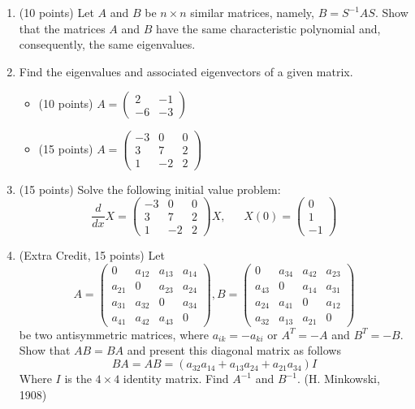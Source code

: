 \documentclass[fleqn]{article}
\begin{document}
  \begin{enumerate}
    \item (10 points) Let $A$ and $B$ be $n \times n$ similar matrices, namely, $B=S^{-1} AS$. Show that the matrices $A$ and $B$ have 
    the same characteristic polynomial and,  consequently, the same eigenvalues.

    \item Find the eigenvalues and associated eigenvectors of a given matrix.
    \begin{itemize}
      \item (10 points) $A=\begin{pmatrix}
        2 & -1 
        \\
        -6 & -3
      \end{pmatrix}$
      \item (15 points) $A=\begin{pmatrix}
        -3 & 0 & 0
        \\
        3 & 7 & 2
        \\
        1 & -2 & 2
      \end{pmatrix}$
    \end{itemize}

    \item (15 points) Solve the following initial value problem:
    $$
      \dfrac{d}{dx} X=\begin{pmatrix}
        -3 & 0 & 0
        \\
        3 & 7 & 2 
        \\
        1 & -2 & 2
      \end{pmatrix} X, ~~~~~~~ X(0)=\begin{pmatrix}
        0 
        \\
        1
        \\
        -1
      \end{pmatrix}
    $$

    \item  (Extra Credit, 15 points) Let
    $$
      A=\begin{pmatrix}
        0 & a_{12} & a_{13} & a_{14}
        \\
        a_{21} & 0 & a_{23} & a_{24}
        \\
        a_{31} & a_{32} & 0 & a_{34}
        \\
        a_{41} & a_{42} & a_{43} & 0
      \end{pmatrix}
      , B=\begin{pmatrix}
        0 & a_{34} & a_{42} & a_{23}
        \\
        a_{43} & 0 & a_{14} & a_{31}
        \\
        a_{24} & a_{41} & 0 & a_{12}
        \\
        a_{32} & a_{13} & a_{21} & 0
      \end{pmatrix}
    $$
    be two antisymmetric matrices, where $a_{ik}=-a_{ki}$ or $A^T=-A$ and $B^T=-B$. Show that 
    $AB=BA$ and present this diagonal matrix as follows
    $$
      BA=AB=\left(a_{32} a_{14}+a_{13} a_{24}+a_{21} a_{34}\right) I
    $$ 
    Where $I$ is the $4 \times 4$ identity matrix. Find $A^{-1}$ and $B^{-1}$. (H. Minkowski, 1908)
  \end{enumerate}
\end{document}

